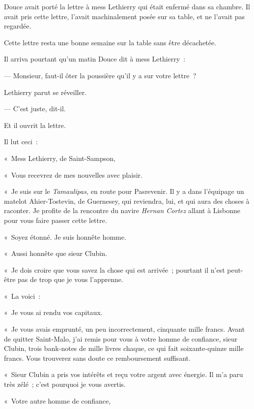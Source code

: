 \documentclass[french,twoside]{book} %
\newcommand{\dateline}[1]{\medskip{\RaggedLeft{#1}\par}\bigskip}
\begin{document}
 Douce avait porté la lettre à mess Lethierry qui était enfermé dans sa chambre. Il avait pris cette lettre, l’avait machinalement posée sur sa table, et ne l’avait pas regardée.\par
Cette lettre resta une bonne semaine sur la table sans être décachetée.\par
Il arriva pourtant qu’un matin Douce dit à mess Lethierry :\par
— Monsieur, faut-il ôter la poussière qu’il y a sur votre lettre ?\par
Lethierry parut se réveiller.\par
— C’est juste, dit-il.\par
Et il ouvrit la lettre.\par
Il lut ceci :\par
\bigbreak

\dateline{« En mer, ce 10 mars.}
\noindent « Mess Lethierry, de Saint-Sampson,\par
« Vous recevrez de mes nouvelles avec plaisir.\par
« Je suis sur le \emph{Tamaulipas,} en route pour Pasrevenir. Il y a dans l’équipage un matelot Ahier-Tostevin, de Guernesey, qui reviendra, lui, et qui aura des choses à raconter. Je profite de la rencontre du navire \emph{Hernan Cortez} allant à Lisbonne pour vous faire passer cette lettre.\par
« Soyez étonné. Je suis honnête homme.\par
« Aussi honnête que sieur Clubin.\par
« Je dois croire que vous savez la chose qui est arrivée ; pourtant il n’est peut-être pas de trop que je vous l’apprenne.\par
« La voici :\par
 « Je vous ai rendu vos capitaux.\par
« Je vous avais emprunté, un peu incorrectement, cinquante mille francs. Avant de quitter Saint-Malo, j’ai remis pour vous à votre homme de confiance, sieur Clubin, trois bank-notes de mille livres chaque, ce qui fait soixante-quinze mille francs. Vous trouverez sans doute ce remboursement suffisant.\par
« Sieur Clubin a pris vos intérêts et reçu votre argent avec énergie. Il m’a paru très zélé ; c’est pourquoi je vous avertis.\par
\bigbreak
\noindent « Votre autre homme de confiance,\par
\bigbreak
\end{document}
